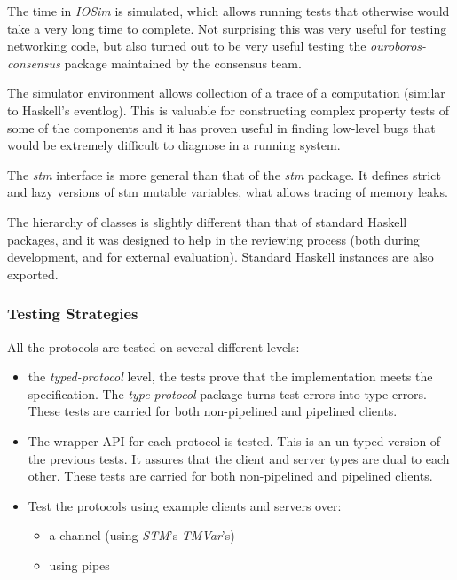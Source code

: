 \documentclass[11pt,a4paper]{article}
\begin{document}
The time in \emph{IOSim} is simulated, which allows running tests that
otherwise would take a very long time to complete. Not surprising this
was very useful for testing networking code, but also turned out to be
very useful testing the \emph{ouroboros-consensus} package maintained by
the consensus team.

The simulator environment allows collection of a trace of a computation
(similar to Haskell's eventlog). This is valuable for constructing
complex property tests of some of the components and it has proven
useful in finding low-level bugs that would be extremely difficult to
diagnose in a running system.

The \emph{stm} interface is more general than that of the \emph{stm}
package. It defines strict and lazy versions of stm mutable variables,
what allows tracing of memory leaks.

The hierarchy of classes is slightly different than that of standard
Haskell packages, and it was designed to help in the reviewing process
(both during development, and for external evaluation). Standard Haskell
instances are also exported.

\subsubsection{Testing Strategies}
\label{testing-strategies}

All the protocols are tested on several different levels:

\begin{itemize}
\item
  the \emph{typed-protocol} level, the tests prove that the
  implementation meets the specification. The \emph{type-protocol}
  package turns test errors into type errors. These tests are carried
  for both non-pipelined and pipelined clients.
\item
  The wrapper API for each protocol is tested. This is an un-typed
  version of the previous tests. It assures that the client and server
  types are dual to each other. These tests are carried for both
  non-pipelined and pipelined clients.
\item
  Test the protocols using example clients and servers over:

  \begin{itemize}
  \item
    a channel (using \emph{STM}'s \emph{TMVar}'s)
  \item
    using pipes
  \end{itemize}
\end{itemize}
\end{document}
